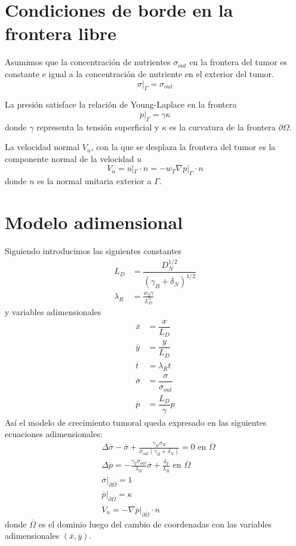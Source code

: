 \section{Condiciones de borde en la frontera libre}
Asumimos que la concentración de nutrientes $\sigma_{out}$ en la frontera del tumor es constante e igual a la concentración de nutriente en el exterior del tumor.
\begin{equation}
	\sigma |_{\Gamma}  = \sigma_{out}
\end{equation}

La presión satisface la relación de Young-Laplace en la frontera 
\begin{equation}
	p |_{\Gamma}  = \gamma \kappa
\end{equation}
donde $\gamma$ representa la tensión superficial y $\kappa$ es la curvatura de la frontera $\partial\Omega$.

La velocidad normal $V_n$, con la que se desplaza la frontera del tumor es la componente normal de la velocidad $u$ 
\begin{equation}
	V_n = 	u |_{\Gamma} \cdot n  = 
	-w_T	\nabla p |_{\Gamma} \cdot n 
\end{equation}
donde $n$ es la normal unitaria exterior a $\Gamma$.

\section{Modelo adimensional}

Siguiendo \citep{cristini2008nonlinear} introducimos las siguientes constantes
\begin{align}
	L_D & = \dfrac{ D_N^{1/2}}{ (\gamma_B + \delta_N)^{1/2}}\\
	\lambda_R &= \frac{w_T \gamma}{ L^3_D}
\end{align}
y variables adimensionales
\begin{align}
	\overline{x} & = \dfrac{ x}{L_D}\\
	\overline{y} & = \dfrac{ y}{L_D}\\
	\overline{t} & = \lambda_R t\\	
	\overline{\sigma} & = \dfrac{ \sigma}{\sigma_{out}}\\
	\overline{p} & = \dfrac{ L_D}{\gamma }p					
\end{align}
Así el modelo de crecimiento tumoral queda expresado en las siguientes ecuaciones adimensionales:
\begin{align}
	&	\Delta \overline{\sigma}- \overline{\sigma}+  \frac{\gamma_B\sigma_B}{\sigma_{out}(\gamma_B + \delta_N)}=0 \text{ en } \overline{\Omega}\\
	&	\Delta \overline{p} = -\frac{\gamma_T \sigma_{out}}{\lambda_R} \overline{\sigma} + \frac{\delta _T}{\lambda_R}\text{ en } \overline{\Omega}\\
	&	\overline{\sigma} |_{\partial \overline{\Omega}}  = 1\\
	&	\overline{p} |_{\partial \overline{\Omega}}  = \kappa \\
	&	\overline{V}_n = 	
	-	\nabla \overline{p} |_{\partial \overline{\Omega}} \cdot n 
\end{align}
donde $\overline{\Omega}$ es el dominio luego del cambio de coordenadas con las variables adimensionales $(\overline{x},\overline{y})$.
